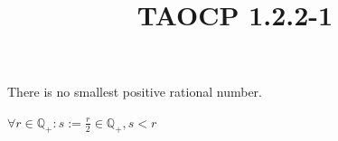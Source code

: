 \documentclass{article}
\title{TAOCP 1.2.2\mbox{-}1}
\begin{document}
\maketitle

There is no smallest positive rational number.

\( \forall r \in \mathbb{Q}_+: s := \frac{r}{2} \in \mathbb{Q}_+, s < r \)
\end{document}
